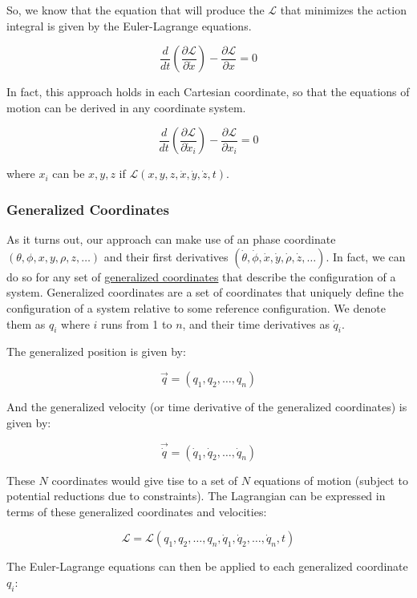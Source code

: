 \documentclass[11pt]{article}
\begin{document}
So, we know that the equation that will produce the \(\mathcal{L}\) that
minimizes the action integral is given by the Euler-Lagrange equations.

\[\frac{d}{dt} \left( \frac{\partial \mathcal{L}}{\partial \dot{x}} \right) - \frac{\partial \mathcal{L}}{\partial x} = 0\]

In fact, this approach holds in each Cartesian coordinate, so that the
equations of motion can be derived in any coordinate system.

\[\frac{d}{dt} \left( \frac{\partial \mathcal{L}}{\partial \dot{x}_i} \right) - \frac{\partial \mathcal{L}}{\partial x_i} = 0\]

where \(x_i\) can be \(x, y, z\) if
\(\mathcal{L}(x,y,z,\dot{x},\dot{y},\dot{z},t)\).

    \subsubsection{Generalized Coordinates}\label{generalized-coordinates}

As it turns out, our approach can make use of an phase coordinate
\((\theta, \phi, x, y, \rho, z, \ldots)\) and their first derivatives
\((\dot{\theta}, \dot{\phi}, \dot{x}, \dot{y}, \dot{\rho}, \dot{z}, \ldots)\).
In fact, we can do so for any set of
\href{https://en.wikipedia.org/wiki/Generalized_coordinates}{generalized
coordinates} that describe the configuration of a system. Generalized
coordinates are a set of coordinates that uniquely define the
configuration of a system relative to some reference configuration. We
denote them as \(q_i\) where \(i\) runs from 1 to \(n\), and their time
derivatives as \(\dot{q}_i\).

The generalized position is given by:

\[\vec{q} = (q_1, q_2, \ldots, q_n)\]

And the generalized velocity (or time derivative of the generalized
coordinates) is given by:

\[\vec{\dot{q}} = \left(\dot{q}_1, \dot{q}_2, \ldots, \dot{q}_n\right)\]

These \(N\) coordinates would give tise to a set of \(N\) equations of
motion (subject to potential reductions due to constraints). The
Lagrangian can be expressed in terms of these generalized coordinates
and velocities:

\[
\mathcal{L} = \mathcal{L}(q_1, q_2, \ldots, q_n, \dot{q}_1, \dot{q}_2, \ldots, \dot{q}_n, t)
\]

The Euler-Lagrange equations can then be applied to each generalized
coordinate \(q_i\):
\end{document}
